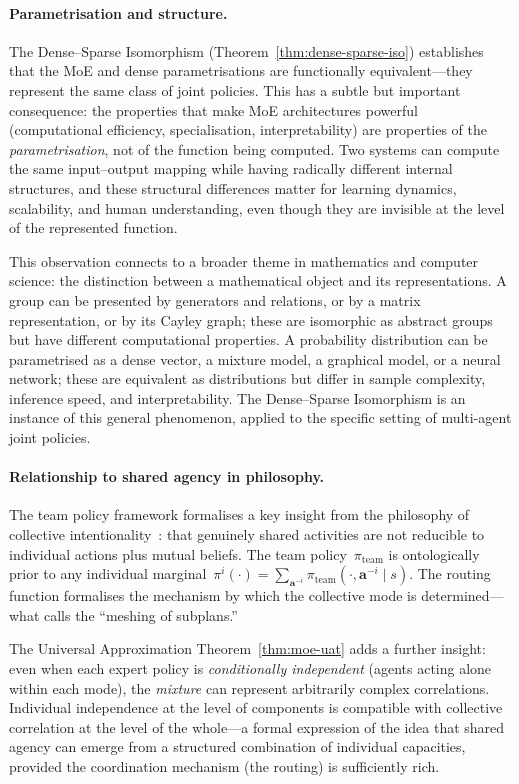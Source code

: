 \paragraph{Parametrisation and structure.} The Dense--Sparse Isomorphism (Theorem~\ref{thm:dense-sparse-iso}) establishes that the MoE and dense parametrisations are functionally equivalent---they represent the same class of joint policies. This has a subtle but important consequence: the properties that make MoE architectures powerful (computational efficiency, specialisation, interpretability) are properties of the \emph{parametrisation}, not of the function being computed. Two systems can compute the same input--output mapping while having radically different internal structures, and these structural differences matter for learning dynamics, scalability, and human understanding, even though they are invisible at the level of the represented function.

This observation connects to a broader theme in mathematics and computer science: the distinction between a mathematical object and its representations. A group can be presented by generators and relations, or by a matrix representation, or by its Cayley graph; these are isomorphic as abstract groups but have different computational properties. A probability distribution can be parametrised as a dense vector, a mixture model, a graphical model, or a neural network; these are equivalent as distributions but differ in sample complexity, inference speed, and interpretability. The Dense--Sparse Isomorphism is an instance of this general phenomenon, applied to the specific setting of multi-agent joint policies.

\paragraph{Relationship to shared agency in philosophy.} The team policy framework formalises a key insight from the philosophy of collective intentionality~\cite{bratman1993,tuomela2005}: that genuinely shared activities are not reducible to individual actions plus mutual beliefs. The team policy~$\pi_{\mathrm{team}}$ is ontologically prior to any individual marginal~$\pi^i(\cdot) = \sum_{\bm{a}^{-i}}\pi_{\mathrm{team}}(\cdot,\bm{a}^{-i}\mid s)$. The routing function formalises the mechanism by which the collective mode is determined---what \cite{bratman1993} calls the ``meshing of subplans.''

The Universal Approximation Theorem~\ref{thm:moe-uat} adds a further insight: even when each expert policy is \emph{conditionally independent} (agents acting alone within each mode), the \emph{mixture} can represent arbitrarily complex correlations. Individual independence at the level of components is compatible with collective correlation at the level of the whole---a formal expression of the idea that shared agency can emerge from a structured combination of individual capacities, provided the coordination mechanism (the routing) is sufficiently rich.

